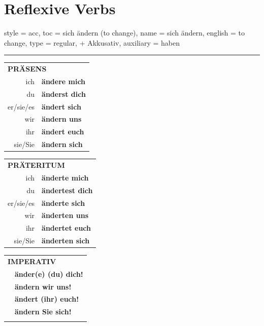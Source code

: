 \chapter{Reflexive Verbs}

\begin{verbentry}{
  style = {acc},
  toc = {sich ändern (to change)},
  name = {sich ändern},
  english = {to change},
  type = {regular, + Akkusativ},
  auxiliary = {haben}
}
 
    
       \vspace{5pt}

    \hrule
    
    \vspace{5pt}

  \begin{tabular}{rl}
     \multicolumn{2}{l}{\textbf{PRÄSENS} }\\
    ich & \textbf{ändere mich}\\
    du & \textbf{änderst dich}\\
    er/sie/es & \textbf{ändert sich}\\
    wir & \textbf{ändern uns}\\
    ihr & \textbf{ändert euch}\\
    sie/Sie & \textbf{ändern sich}\\
  \end{tabular}
  \hfill
     \begin{tabular}{rl}
    \multicolumn{2}{l}{\textbf{PRÄTERITUM} }\\
    ich & \textbf{änderte mich}\\
    du & \textbf{ändertest dich}\\
    er/sie/es & \textbf{änderte sich}\\
    wir & \textbf{änderten uns}\\
    ihr & \textbf{ändertet euch}\\
    sie/Sie & \textbf{änderten sich}\\
  \end{tabular}
  \hfill
  \begin{tabular}{rl}
     \multicolumn{2}{l}{\textbf{IMPERATIV} }\\
   & \textbf{änder(e) (du) dich!}\\
   & \textbf{ändern wir uns!}\\
   & \textbf{ändert (ihr) euch!}\\
   & \textbf{ändern Sie sich!}\\
   & \vspace{10pt}
  \end{tabular}


\end{verbentry}
